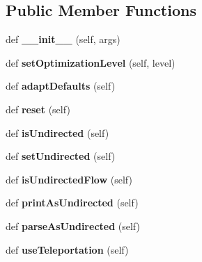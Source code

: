 \subsection*{Public Member Functions}
\begin{DoxyCompactItemize}
\item 
\mbox{\label{classinfomap_1_1Config_a6c132003db78abe2e31f6045e1db90d4}} 
def {\bfseries \+\_\+\+\_\+init\+\_\+\+\_\+} (self, args)
\item 
\mbox{\label{classinfomap_1_1Config_a659b27c6011214dc79915f3ba05f0252}} 
def {\bfseries set\+Optimization\+Level} (self, level)
\item 
\mbox{\label{classinfomap_1_1Config_adddd8b8fdf608a5e6e4d7f6d56af1631}} 
def {\bfseries adapt\+Defaults} (self)
\item 
\mbox{\label{classinfomap_1_1Config_af6e9d6260608866d7f0f3abfc70b9f39}} 
def {\bfseries reset} (self)
\item 
\mbox{\label{classinfomap_1_1Config_a88278b63bfacf36430e14615ad6c6c4f}} 
def {\bfseries is\+Undirected} (self)
\item 
\mbox{\label{classinfomap_1_1Config_a506d5908a643bc74dc279a930f4a3f6b}} 
def {\bfseries set\+Undirected} (self)
\item 
\mbox{\label{classinfomap_1_1Config_ad1ec106314e54a2b4286db574bfbf9e9}} 
def {\bfseries is\+Undirected\+Flow} (self)
\item 
\mbox{\label{classinfomap_1_1Config_ae5713725cceb215a5a2da9a0a3af0ee8}} 
def {\bfseries print\+As\+Undirected} (self)
\item 
\mbox{\label{classinfomap_1_1Config_af916306d0b9d7785c4eeebbbbb5c7db8}} 
def {\bfseries parse\+As\+Undirected} (self)
\item 
\mbox{\label{classinfomap_1_1Config_af691c96c4d367798f2cce174a1673432}} 
def {\bfseries use\+Teleportation} (self)
\item 

\end{DoxyCompactItemize}
